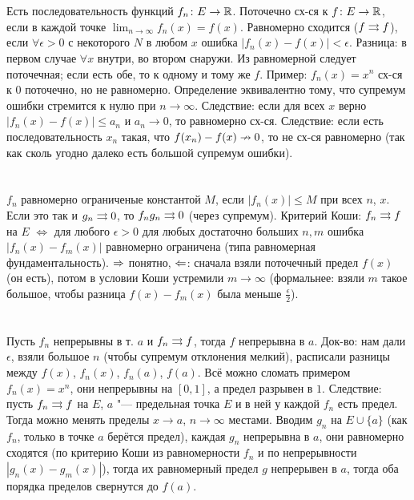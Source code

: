 \section{} %
Есть последовательность функций $f_n \colon E \to \mathbb{R}$.
Поточечно сх-ся к $f \colon E \to \mathbb{R}$, если в каждой точке $\lim_{n\to\infty} f_n(x) = f(x)$.
Равномерно сходится ($f \rightrightarrows f$), если $\forall \epsilon > 0$ с некоторого $N$
в любом $x$ ошибка $|f_n(x)-f(x)|<\epsilon$.
Разница: в первом случае $\forall x$ внутри, во втором снаружи.
Из равномерной следует поточечная; если есть обе, то к одному и тому же $f$.
Пример: $f_n(x)=x^n$ сх-ся к 0 поточечно, но не равномерно.
Определение эквивалентно тому, что супремум ошибки стремится к нулю при $n\to\infty$.
Следствие: если для всех $x$ верно $|f_n(x)-f(x)|\le a_n$ и $a_n \to 0$, то равномерно сх-ся.
Следствие: если есть последовательность $x_n$ такая, что $f(x_n) - f(x) \nrightarrow 0$, то не сх-ся равномерно
(так как сколь угодно далеко есть большой супремум ошибки).

\section{} %
$f_n$ равномерно ограниченые константой $M$, если $|f_n(x)| \le M$ при всех $n$, $x$.
Если это так и $g_n \rightrightarrows 0$, то $f_ng_n \rightrightarrows 0$ (через супремум).
Критерий Коши: $f_n \rightrightarrows f$ на $E$ $\iff$ для любого $\epsilon > 0$ для любых достаточно больших $n, m$
ошибка $|f_n(x) - f_m(x)|$ равномерно ограничена (типа равномерная фундаментальность).
$\Rightarrow$ понятно, $\Leftarrow$: сначала взяли поточечный предел $f(x)$ (он есть), потом в условии Коши устремили $m \to \infty$
(формальнее: взяли $m$ такое большое, чтобы разница $f(x)-f_m(x)$ была меньше $\frac{\epsilon}{2}$).

\section{} %
Пусть $f_n$ непрерывны в т. $a$ и $f_n \rightrightarrows f$, тогда $f$ непрерывна в $a$.
Док-во: нам дали $\epsilon$, взяли большое $n$ (чтобы супремум отклонения мелкий),
расписали разницы между $f(x)$, $f_n(x)$, $f_n(a)$, $f(a)$.
Всё можно сломать примером $f_n(x)=x^n$, они непрерывны на $[0,1]$, а предел разрывен в $1$.
Следствие: пусть $f_n \rightrightarrows f$ на $E$, $a$ "--- предельная точка $E$ и в ней у каждой $f_n$ есть предел.
Тогда можно менять пределы $x\to a$, $n \to \infty$ местами.
Вводим $g_n$ на $E \cup \{a\}$ (как $f_n$, только в точке $a$ берётся предел), каждая $g_n$ непрерывна в $a$,
они равномерно сходятся (по критерию Коши из равномерности $f_n$ и по непрерывности $|g_n(x)-g_m(x)|$), тогда их равномерный предел $g$ непрерывен в $a$,
тогда оба порядка пределов свернутся до $f(a)$.

